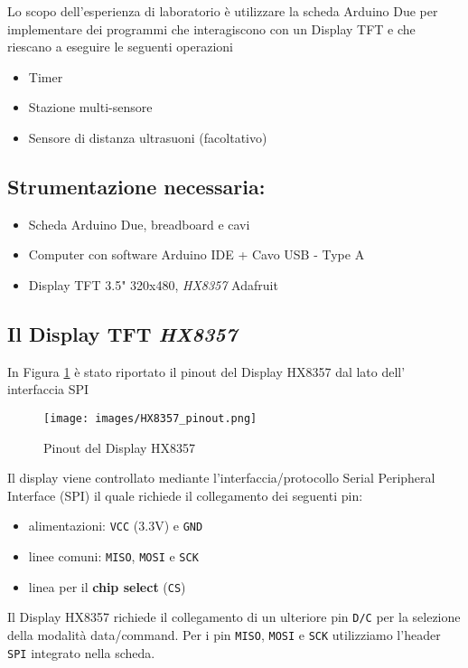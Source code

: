 Lo scopo dell'esperienza di laboratorio è utilizzare la scheda Arduino Due per implementare dei programmi che interagiscono con un Display TFT e che riescano a eseguire le seguenti operazioni
\begin{itemize}
    \item Timer
    \item Stazione multi-sensore
    \item Sensore di distanza ultrasuoni (facoltativo)
\end{itemize}
\subsection*{Strumentazione necessaria:}
\begin{itemize}
    \item Scheda Arduino Due, breadboard e cavi
    \item Computer con software Arduino IDE + Cavo USB - Type A
    \item Display TFT 3.5" 320x480, \textit{HX8357} Adafruit
\end{itemize}
\subsection*{Il Display TFT \textit{HX8357}}
In Figura \ref{fig:HX8357_pinout} è stato riportato il pinout del Display HX8357 dal lato dell' interfaccia SPI
\begin{figure}[H]
    \centering
    \texttt{[image: images/HX8357\_pinout.png]}
    \caption{Pinout del Display HX8357}
    \label{fig:HX8357_pinout}
\end{figure}
\noindent Il display viene controllato mediante l'interfaccia/protocollo Serial Peripheral Interface (SPI) il quale richiede il collegamento dei seguenti pin:
\begin{itemize}
    \item alimentazioni: \texttt{VCC} ($3.3$V) e \texttt{GND}
    \item linee comuni: \texttt{MISO}, \texttt{MOSI} e \texttt{SCK}
    \item linea per il \textbf{chip select} (\texttt{CS})
\end{itemize}
Il Display HX8357 richiede il collegamento di un ulteriore pin \texttt{D/C} per la selezione della modalità data/command. Per i pin \texttt{MISO}, \texttt{MOSI} e \texttt{SCK} utilizziamo l'header \texttt{SPI} integrato nella scheda.